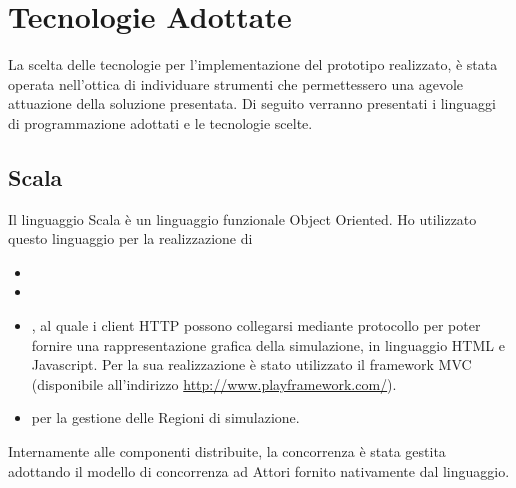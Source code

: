\chapter{Tecnologie Adottate}

La scelta delle tecnologie per l'implementazione del prototipo realizzato, è stata operata nell'ottica di individuare strumenti che permettessero una agevole attuazione della soluzione presentata. 
Di seguito verranno presentati i linguaggi di programmazione adottati e le tecnologie scelte.

	\section{Scala}
		Il linguaggio Scala è un linguaggio funzionale Object Oriented. Ho utilizzato questo linguaggio per la realizzazione di 
			\begin{itemize}
				\item {}
				\item {}
				\item {}, al quale i client HTTP possono collegarsi mediante protocollo  per poter fornire una rappresentazione grafica della simulazione, in linguaggio HTML e Javascript. Per la sua realizzazione è stato utilizzato il framework MVC  (disponibile all'indirizzo \url{http://www.playframework.com/}).
				\item {} per la gestione delle Regioni di simulazione.
			\end{itemize}
		Internamente alle componenti distribuite, la concorrenza è stata gestita adottando il modello di concorrenza ad Attori fornito nativamente dal linguaggio. 
